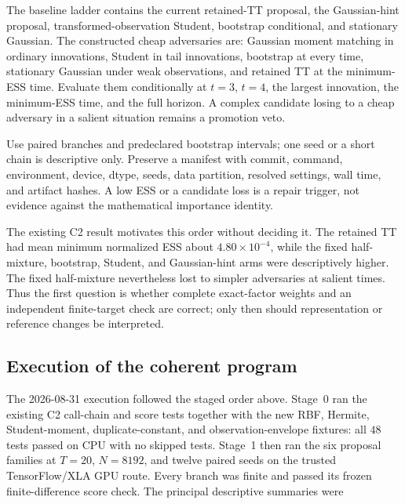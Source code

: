 \documentclass[11pt]{article}
\begin{document}
The baseline ladder contains the current retained-TT proposal, the Gaussian-hint
proposal, transformed-observation Student, bootstrap conditional, and stationary
Gaussian. The constructed cheap adversaries are: Gaussian moment matching in
ordinary innovations, Student in tail innovations, bootstrap at every time,
stationary Gaussian under weak observations, and retained TT at the minimum-ESS
time. Evaluate them conditionally at $t=3$, $t=4$, the largest innovation, the
minimum-ESS time, and the full horizon. A complex candidate losing to a cheap
adversary in a salient situation remains a promotion veto.

Use paired branches and predeclared bootstrap intervals; one seed or a short
chain is descriptive only. Preserve a manifest with commit, command,
environment, device, dtype, seeds, data partition, resolved settings, wall
time, and artifact hashes. A low ESS or a candidate loss is a repair trigger,
not evidence against the mathematical importance identity.

The existing C2 result motivates this order without deciding it. The retained
TT had mean minimum normalized ESS about $4.80\times10^{-4}$, while the fixed
half-mixture, bootstrap, Student, and Gaussian-hint arms were descriptively
higher. The fixed half-mixture nevertheless lost to simpler adversaries at
salient times. Thus the first question is whether complete exact-factor
weights and an independent finite-target check are correct; only then should
representation or reference changes be interpreted.

\subsection{Execution of the coherent program}

The 2026-08-31 execution followed the staged order above. Stage~0 ran the
existing C2 call-chain and score tests together with the new RBF, Hermite,
Student-moment, duplicate-constant, and observation-envelope fixtures: all
$48$ tests passed on CPU with no skipped tests. Stage~1 then ran the six
proposal families at $T=20$, $N=8192$, and twelve paired seeds on the trusted
TensorFlow/XLA GPU route. Every branch was finite and passed its frozen
finite-difference score check. The principal descriptive summaries were
\end{document}

